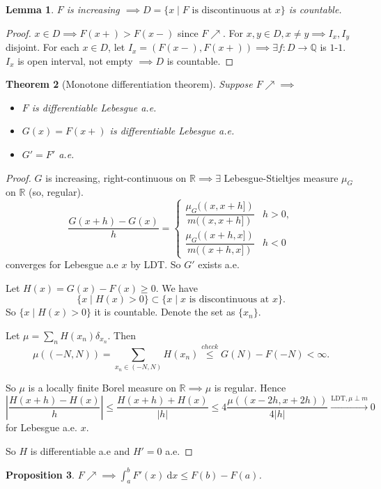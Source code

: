 \documentclass{report}
\newcommand{\R}{\mathbb{R}}
\newcommand{\Q}{\mathbb{Q}}
\newcommand{\df}{\ \mathrm{d}}
\newtheorem{theorem}{Theorem}[chapter]
\newtheorem{lemma}[theorem]{Lemma}
\newtheorem{proposition}[theorem]{Proposition}
\theoremstyle{definition}
\theoremstyle{remark}
\begin{document}
\begin{lemma}
	$F$ is increasing $\implies D = \{x \mid F \text{ is discontinuous at } x\}$ is countable.
\end{lemma}
\begin{proof}
	$x \in D \implies F(x+) > F(x-)$ since $F \nearrow$. For $x, y \in D, x \neq y \implies I_x, I_y$ disjoint. For each $x \in D$, let $I_x = (F(x-), F(x+)) \implies \exists f: D \to \Q$ is $1$-$1$. $I_x$ is open interval, not empty $\implies D$ is countable. 
\end{proof}

\begin{theorem}[Monotone differentiation theorem]
	Suppose $F \nearrow \implies$ \begin{itemize}
		\item $F$ is differentiable Lebesgue a.e.
		\item $G(x) = F(x+)$ is differentiable Lebesgue a.e.
		\item $G' = F'$ a.e.
	\end{itemize}
\end{theorem}
\begin{proof}
	$G$ is increasing, right-continuous on $\R \implies \exists$ Lebesgue-Stieltjes measure $\mu_G$ on $\R$ (so, regular). 
	\[
		\frac{G(x + h) - G(x)}{h} = \begin{cases}
			\dfrac{\mu_G((x, x+h])}{m((x, x+h])} & h > 0, \\[1em]
			\dfrac{\mu_G((x+h, x])}{m((x+h, x])} & h < 0
		\end{cases}	
	\] converges for Lebesgue a.e $x$ by LDT. So $G'$ exists a.e.

	Let $H(x) = G(x) - F(x) \geq 0$. We have \[\{x \mid H(x) > 0\} \subset \{x \mid x \text{ is discontinuous at } x\}.\]
	So $\{x \mid H(x) > 0\}$ it is countable. Denote the set as $\{x_n\}$.
	
	Let $\mu = \sum_{n} H(x_n) \delta_{x_n}$. Then \[\mu((-N, N)) = \sum_{x_n \in (-N, N)} H(x_n) \stackrel{check}{\leq} G(N) - F(-N) < \infty.\]

	So $\mu$ is a locally finite Borel measure on $\R \implies \mu$ is regular. Hence \[
		\left|\frac{H(x + h) - H(x)}{h}\right| \leq \frac{H(x + h) + H(x)}{|h|} \leq 4 \frac{\mu((x-2h, x+2h))}{4|h|} \xrightarrow[]{\text{LDT}, \mu \perp m} 0
	\] for Lebesgue a.e. $x$.

	So $H$ is differentiable a.e and $H' = 0$ a.e.
\end{proof}

\begin{proposition}
	$F \nearrow \implies \displaystyle \int_a^b F'(x) \df x \leq F(b) - F(a)$.
\end{proposition}
\end{document}
